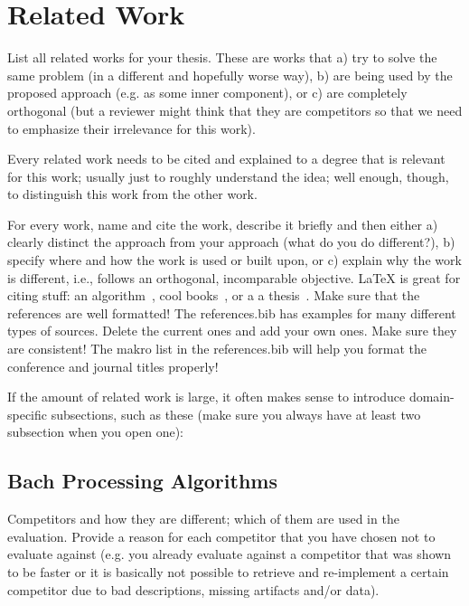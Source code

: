 \section{Related Work}
\label{sec:relatedwork}

List all related works for your thesis. These are works that a) try to solve the same problem (in a different and hopefully worse way), b) are being used by the proposed approach (e.g. as some inner component), or c) are completely orthogonal (but a reviewer might think that they are competitors so that we need to emphasize their irrelevance for this work). 

Every related work needs to be cited and explained to a degree that is relevant for this work; usually just to roughly understand the idea; well enough, though, to distinguish this work from the other work.

For every work, name and cite the work, describe it briefly and then either a) clearly distinct the approach from your approach (what do you do different?), b) specify where and how the work is used or built upon, or c) explain why the work is different, i.e., follows an orthogonal, incomparable objective. LaTeX is great for citing stuff: an algorithm~\cite{papenbrock2016a}, cool books~\cite{ullman1990principles, garcia_molina2008database}, or a a thesis~\cite{le2014on}. Make sure that the references are well formatted! The references.bib has examples for many different types of sources. Delete the current ones and add your own ones. Make sure they are consistent! The makro list in the references.bib will help you format the conference and journal titles properly!

If the amount of related work is large, it often makes sense to introduce domain-specific subsections, such as these (make sure you always have at least two subsection when you open one):

\subsection{Bach Processing Algorithms}

Competitors and how they are different; which of them are used in the evaluation. Provide a reason for each competitor that you have chosen not to evaluate against (e.g. you already evaluate against a competitor that was shown to be faster or it is basically not possible to retrieve and re-implement a certain competitor due to bad descriptions, missing artifacts and/or data). 

